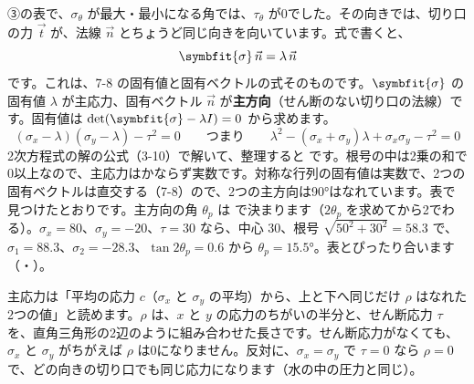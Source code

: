 \leavevmode\label{ph:力-9:sec7}③の表で、$\sigma_\theta$ が最大・最小になる角では、$\tau_\theta$ が0でした。その向きでは、切り口の力 $\vec t$ が、法線 $\vec n$ とちょうど同じ向きを向いています。式で書くと、
\[\symbfit{\sigma}\,\vec n=\lambda\,\vec n\]
です。これは、7-8 の固有値と固有ベクトルの式そのものです。$\symbfit{\sigma}$ の固有値 $\lambda$ が主応力、固有ベクトル $\vec n$ が\textbf{主方向}（せん断のない切り口の法線）です。固有値は $\det(\symbfit{\sigma}-\lambda I)=0$ から求めます。
\[(\sigma_x-\lambda)(\sigma_y-\lambda)-\tau^2=0\qquad\text{つまり}\qquad\lambda^2-(\sigma_x+\sigma_y)\lambda+\sigma_x\sigma_y-\tau^2=0\]
2次方程式の解の公式（3-10）で解いて、整理すると
\label{ph:力-9:shu}です。根号の中は2乗の和で0以上なので、主応力はかならず実数です。対称な行列の固有値は実数で、2つの固有ベクトルは直交する（7-8）ので、2つの主方向は90°はなれています。表で見つけたとおりです。主方向の角 $\theta_p$ は
で決まります（$2\theta_p$ を求めてから2でわる）。$\sigma_x=80$、$\sigma_y=-20$、$\tau=30$ なら、中心 $30$、根号 $\sqrt{50^2+30^2}=58.3$ で、$\sigma_1=88.3$、$\sigma_2=-28.3$、$\tan2\theta_p=0.6$ から $\theta_p=15.5°$。表とぴったり合います（・）。
\begin{phflow}
\end{phflow}
\begin{phyomi}[$\sigma_{1,2}=c\pm\rho$]
主応力は「平均の応力 $c$（$\sigma_x$ と $\sigma_y$ の平均）から、上と下へ同じだけ $\rho$ はなれた2つの値」と読めます。$\rho$ は、$x$ と $y$ の応力のちがいの半分と、せん断応力 $\tau$ を、直角三角形の2辺のように組み合わせた長さです。せん断応力がなくても、$\sigma_x$ と $\sigma_y$ がちがえば $\rho$ は0になりません。反対に、$\sigma_x=\sigma_y$ で $\tau=0$ なら $\rho=0$ で、どの向きの切り口でも同じ応力になります（水の中の圧力と同じ）。
\end{phyomi}

